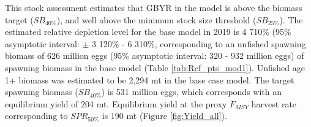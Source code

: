 \documentclass[12pt,]{article}
\begin{document}
This stock assessment estimates that GBYR in the model is above the
biomass target (\(SB_{40\%}\)), and well above the minimum stock size
threshold (\(SB_{25\%}\)). The estimated relative depletion level for
the base model in 2019 is 4 710\% (95\% asymptotic interval: \(\pm\) 3
120\% - 6 310\%, corresponding to an unfished spawning biomass of 626
million eggs (95\% asymptotic interval: 320 - 932 million eggs) of
spawning biomass in the base model (Table \ref{tab:Ref_pts_mod1}).
Unfished age 1+ biomass was estimated to be 2,294 mt in the base case
model. The target spawning biomass (\(SB_{40\%}\)) is 531 million eggs,
which corresponds with an equilibrium yield of 204 mt. Equilibrium yield
at the proxy \(F_{MSY}\) harvest rate corresponding to \(SPR_{50\%}\) is
190 mt (Figure \ref{fig:Yield_all}).

\FloatBarrier
\end{document}
